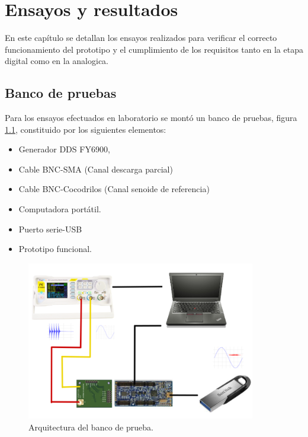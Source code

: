 
\chapter{Ensayos y resultados} %

\label{Chapter4} %
En este capítulo se detallan los ensayos realizados para verificar el correcto funcionamiento del prototipo y el cumplimiento de los requisitos tanto en la etapa digital como en la analogica.

\section{Banco de pruebas}
Para los ensayos efectuados en laboratorio se montó un banco de pruebas, figura \ref{fig:bancoDePruebas}, constituido por los siguientes elementos:

\begin{itemize}
\item Generador DDS FY6900,
\item Cable BNC-SMA (Canal descarga parcial)
\item Cable BNC-Cocodrilos (Canal senoide de referencia)
\item Computadora portátil. 
\item Puerto serie-USB
\item Prototipo funcional.
\end{itemize}

\vspace{10mm}

\begin{figure}[ht]
	\centering
	\includegraphics[width=100mm]{./Figures/bancoDePruebas.png}
	\caption{Arquitectura del banco de prueba.}
	\label{fig:bancoDePruebas}
\end{figure}

